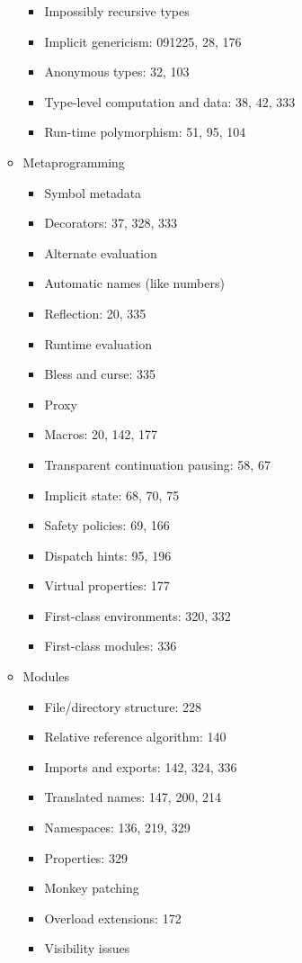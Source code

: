 \begin{itemize}
\begin{itemize}
\begin{itemize}
    \item Impossibly recursive types
    \item Implicit genericism: 091225, 28, 176
    \item Anonymous types: 32, 103
    \item Type-level computation and data: 38, 42, 333
    \item Run-time polymorphism: 51, 95, 104
    \end{itemize}
  \item Metaprogramming
    \begin{itemize}
    \item Symbol metadata
    \item Decorators: 37, 328, 333
    \item Alternate evaluation
    \item Automatic names (like numbers)
    \item Reflection: 20, 335
    \item Runtime evaluation
    \item Bless and curse: 335
    \item Proxy
    \item Macros: 20, 142, 177
    \item Transparent continuation pausing: 58, 67
    \item Implicit state: 68, 70, 75
    \item Safety policies: 69, 166
    \item Dispatch hints: 95, 196
    \item Virtual properties: 177
    \item First-class environments: 320, 332
    \item First-class modules: 336
    \end{itemize}
  \item Modules
    \begin{itemize}
    \item File/directory structure: 228
    \item Relative reference algorithm: 140
    \item Imports and exports: 142, 324, 336
    \item Translated names: 147, 200, 214
    \item Namespaces: 136, 219, 329
    \item Properties: 329
    \item Monkey patching
    \item Overload extensions: 172
    \item Visibility issues

\end{itemize}
\end{itemize}
\end{itemize}
